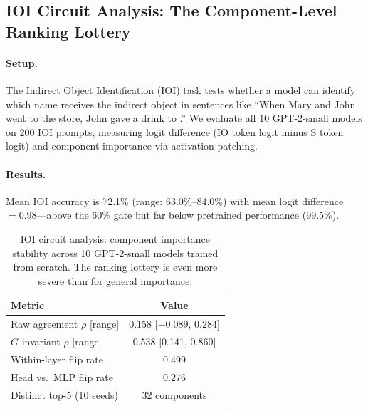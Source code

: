 \documentclass{article}
\begin{document}
\subsection{IOI Circuit Analysis: The Component-Level Ranking Lottery}
\label{sec:ioi-circuit}

\paragraph{Setup.}
The Indirect Object Identification (IOI) task tests whether a model can identify which name receives the indirect object in sentences like ``When Mary and John went to the store, John gave a drink to \underline{\hspace{1cm}}.'' We evaluate all 10 GPT-2-small models on 200 IOI prompts, measuring logit difference (IO token logit minus S token logit) and component importance via activation patching.

\paragraph{Results.}
Mean IOI accuracy is 72.1\% (range: 63.0\%--84.0\%) with mean logit difference $= 0.98$---above the 60\% gate but far below pretrained performance (99.5\%).

\begin{table}[ht]
\centering
\caption{IOI circuit analysis: component importance stability across 10 GPT-2-small models trained from scratch. The ranking lottery is even more severe than for general importance.}
\label{tab:ioi-results}
\small
\begin{tabular}{lc}
\toprule
\textbf{Metric} & \textbf{Value} \\
\midrule
Raw agreement $\rho$ [range] & 0.158 [$-0.089$, 0.284] \\
$G$-invariant $\rho$ [range] & 0.538 [0.141, 0.860] \\
\midrule
Within-layer flip rate & 0.499 \\
Head vs.\ MLP flip rate & 0.276 \\
\midrule
Distinct top-5 (10 seeds) & 32 components \\
\bottomrule
\end{tabular}
\end{table}
\end{document}
